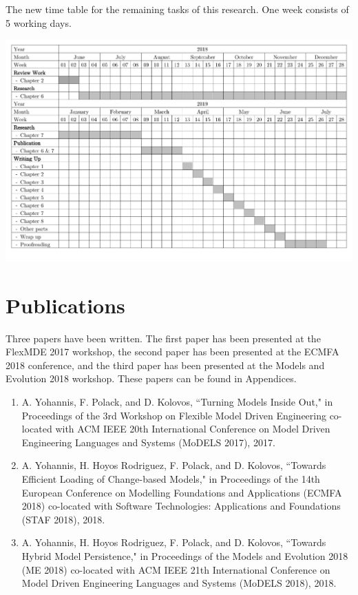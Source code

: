 \documentclass[12pt, a4paper]{report} \usepackage[titletoc]{appendix}
\begin{document}
\begin{landscape}
    
    \begin{table}[h]
        \centering
        \caption{The new time table for the remaining tasks of this research. One week consists of 5 working days. }
        \label{table:new_timetable}
        \centering
        \includegraphics[width=0.95\linewidth]{images/new_timetable}
        \label{fig:new_timetable}
    \end{table}
\end{landscape}

\chapter{Publications}
\label{ch:publications}
Three papers have been written. The first paper \cite{DBLP:conf/models/YohannisKP17} has been presented at the FlexMDE 2017 workshop, the second paper \cite{yohannis2018towards} has been presented at the ECMFA 2018 conference, and the third paper \cite{DBLP:conf/models/YohannisRPK18} has been presented  at the Models and Evolution 2018 workshop. These papers can be found in Appendices.
\begin{enumerate}
\item A. Yohannis, F. Polack, and D. Kolovos, ``Turning Models Inside Out," in Proceedings of the 3rd Workshop on Flexible Model Driven Engineering co-located with ACM IEEE 20th International Conference on Model Driven Engineering Languages and Systems (MoDELS 2017), 2017.
\item  A. Yohannis, H. Hoyos Rodriguez, F. Polack, and D. Kolovos, ``Towards Efficient Loading of Change-based Models," in Proceedings of the 14th European Conference on Modelling Foundations and Applications (ECMFA 2018) co-located with Software Technologies: Applications and Foundations (STAF 2018), 2018.
\item  A. Yohannis, H. Hoyos Rodriguez, F. Polack, and D. Kolovos, ``Towards Hybrid Model Persistence," in Proceedings of the Models and Evolution 2018 (ME 2018) co-located with ACM IEEE 21th International Conference on Model Driven Engineering Languages and Systems (MoDELS 2018), 2018.
\end{enumerate}





\end{document}
